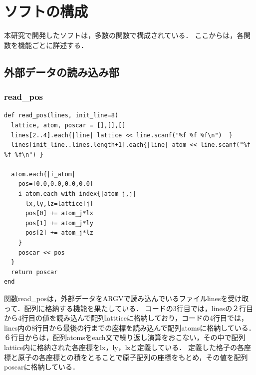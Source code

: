 
\section{ソフトの構成}
本研究で開発したソフトは，多数の関数で構成されている．
ここからは，各関数を機能ごとに詳述する．

\subsection{外部データの読み込み部}
\subsubsection{read\_pos}\begin{lstlisting}[style=customRuby,basicstyle={\scriptsize\ttfamily}]
def read_pos(lines, init_line=8)
  lattice, atom, poscar = [],[],[]
  lines[2..4].each{|line| lattice << line.scanf("%f %f %f\n")  }
  lines[init_line..lines.length+1].each{|line| atom << line.scanf("%f %f %f\n") }

  atom.each{|i_atom|
    pos=[0.0,0.0,0.0,0.0]
    i_atom.each_with_index{|atom_j,j|
      lx,ly,lz=lattice[j]
      pos[0] += atom_j*lx
      pos[1] += atom_j*ly
      pos[2] += atom_j*lz
    }
    poscar << pos
  }
  return poscar
end
\end{lstlisting}
関数read\_posは，外部データをARGVで読み込んでいるファイルlinesを受け取って．配列に格納する機能を果たしている．
コードの3行目では，linesの２行目から4行目の値を読み込んで配列lattticeに格納しており，コードの4行目では，lines内の8行目から最後の行までの座標を読み込んで配列atomsに格納している．
６行目からは，配列atomsをeach文で繰り返し演算をおこない，その中で配列lattice内に格納された各座標をlx，ly，lzと定義している．
定義した格子の各座標と原子の各座標との積をとることで原子配列の座標をもとめ，その値を配列poscarに格納している．


